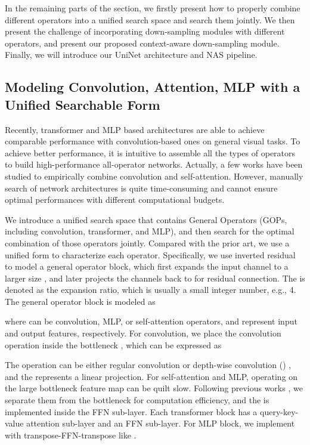 \documentclass{article} \usepackage{iclr2022_conference,times}
\begin{document}
In the remaining parts of the section, we firstly present how to properly combine different operators into a unified search space and search them jointly. We then present the challenge of incorporating down-sampling modules with different operators, and present our proposed context-aware down-sampling module. Finally, we will introduce our UniNet architecture and NAS pipeline.

\subsection{Modeling Convolution, Attention, MLP with a Unified Searchable Form}
\label{sec3.2}

Recently, transformer and MLP based architectures are able to achieve comparable performance with convolution-based ones on general visual tasks. To achieve better performance, it is intuitive to assemble all the types of operators to build high-performance all-operator networks.
Actually, a few works \citep{cvt, yuan2021incorporating, convit} have been studied to empirically combine convolution and self-attention. However, manually search of network architectures is quite time-consuming and cannot ensure optimal performances with different computational budgets.

We introduce a unified search space that contains General Operators (GOPs, including convolution, transformer, and MLP), and then search for the optimal combination of those operators jointly. Compared with the prior art, we use a unified form to characterize each operator. Specifically, we use inverted residual \citep{mbv2} to model a general operator block, which first expands the input channel  to a larger size , and later projects the  channels back to  for residual connection. The  is denoted as the expansion ratio, which is usually a small integer number, e.g., 4. The general operator block is modeled as

where  can be convolution, MLP, or self-attention operators, and  represent input and output features, respectively. For convolution, we place the convolution operation inside the bottleneck \citep{mbv2}, which can be expressed as

The  operation can be either regular convolution or depth-wise convolution () \citep{xception}, and the  represents a linear projection.
For self-attention and MLP, operating on the large bottleneck feature map can be quilt slow. Following previous works \citep{vit, mixer}, we separate them from the bottleneck for computation efficiency, and the  is implemented inside the FFN \citep{attention} sub-layer. Each transformer block has a query-key-value attention sub-layer and an FFN sub-layer. For MLP block, we implement with transpose-FFN-transpose like \citet{mixer}.
\end{document}
